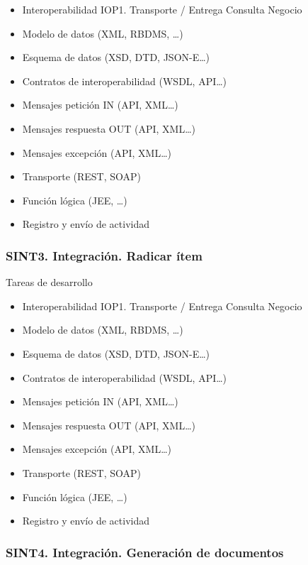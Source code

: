 \documentclass[
  paper=a4,
  ,captions=tableheading
]{scrartcl}
\providecommand{\tightlist}{%
  \setlength{\itemsep}{0pt}\setlength{\parskip}{0pt}}
\begin{document}
\begin{itemize}
\tightlist
\item
  Interoperabilidad IOP1. Transporte / Entrega Consulta Negocio
\item
  Modelo de datos (XML, RBDMS, \ldots)
\item
  Esquema de datos (XSD, DTD, JSON-E\ldots)
\item
  Contratos de interoperabilidad (WSDL, API\ldots)
\item
  Mensajes petición IN (API, XML\ldots)
\item
  Mensajes respuesta OUT (API, XML\ldots)
\item
  Mensajes excepción (API, XML\ldots)
\item
  Transporte (REST, SOAP)
\item
  Función lógica (JEE, \ldots)
\item
  Registro y envío de actividad
\end{itemize}

\subsubsection{SINT3. Integración. Radicar
ítem}\label{sec:sint3.-integraciuxf3n.-radicar-uxedtem-1}

Tareas de desarrollo

\begin{itemize}
\tightlist
\item
  Interoperabilidad IOP1. Transporte / Entrega Consulta Negocio
\item
  Modelo de datos (XML, RBDMS, \ldots)
\item
  Esquema de datos (XSD, DTD, JSON-E\ldots)
\item
  Contratos de interoperabilidad (WSDL, API\ldots)
\item
  Mensajes petición IN (API, XML\ldots)
\item
  Mensajes respuesta OUT (API, XML\ldots)
\item
  Mensajes excepción (API, XML\ldots)
\item
  Transporte (REST, SOAP)
\item
  Función lógica (JEE, \ldots)
\item
  Registro y envío de actividad
\end{itemize}

\subsubsection{SINT4. Integración. Generación de
documentos}\label{sec:sint4.-integraciuxf3n.-generaciuxf3n-de-documentos-1}
\end{document}
